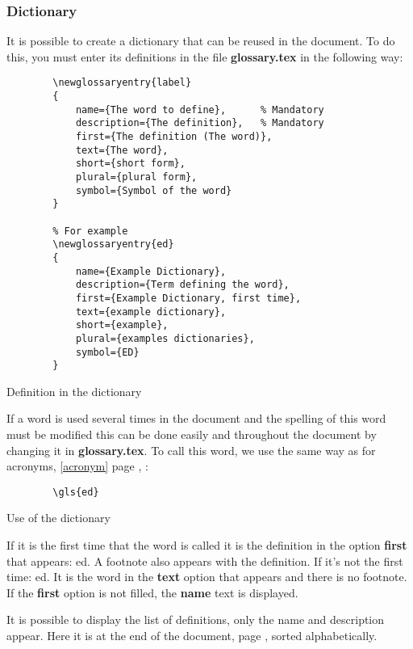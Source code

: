 \subsubsection{Dictionary} \label{dictionary}
It is possible to create a dictionary that can be reused in the document.
To do this, you must enter its definitions in the file \textbf{glossary.tex} in the following way:
\begin{code}
    \begin{verbatim}
        \newglossaryentry{label}
        {
            name={The word to define},      % Mandatory
            description={The definition},   % Mandatory
            first={The definition (The word)},
            text={The word},
            short={short form},
            plural={plural form},
            symbol={Symbol of the word}
        }

        % For example
        \newglossaryentry{ed}
        {
            name={Example Dictionary},
            description={Term defining the word},
            first={Example Dictionary, first time},
            text={example dictionary},
            short={example},
            plural={examples dictionaries},
            symbol={ED}
        }
\end{verbatim}
    \caption{Definition in the dictionary}
\end{code}

If a word is used several times in the document and the spelling of this word must be modified
this can be done easily and throughout the document by changing it in \textbf{glossary.tex}.
To call this word, we use the same way as for acronyms, \ref{acronym} page \pageref{acronym}, :
\begin{code}
    \begin{verbatim}
        \gls{ed}
\end{verbatim}
    \caption{Use of the dictionary}
\end{code}

If it is the first time that the word is called it is the definition in the option \textbf{first} that appears: \gls{ed}.
A footnote also appears with the definition. \newline
If it's not the first time: \gls{ed}. It is the word in the \textbf{text} option that appears and there is no footnote.
If the \textbf{first} option is not filled, the \textbf{name} text is displayed.

It is possible to display the list of definitions, only the name and description appear. Here it is at the end of the document,
page \pageref{domaindictionary}, sorted alphabetically.

